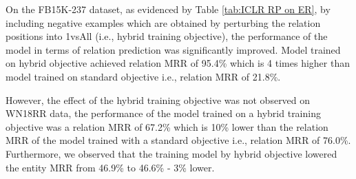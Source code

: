 \begin{table}[!htbp]
\centering
{}
\caption[Model performance in three objectives (selected on entity MRR)]{Model performance in standard, hybrid, and relation training objectives on FB15K-237 and WN18RR. The best models were selected on entity MRR. }
\label{tab:ICLR RP on ER}
\end{table}

On the FB15K-237 dataset, as evidenced by Table \ref{tab:ICLR RP on ER}, by including negative examples which are obtained by perturbing the relation positions into 1vsAll (i.e., hybrid training objective), the performance of the model in terms of relation prediction was significantly improved. Model trained on hybrid objective achieved relation MRR of 95.4\% which is 4 times higher than model trained on standard objective i.e., relation MRR of 21.8\%. 

However, the effect of the hybrid training objective was not observed on WN18RR data, the performance of the model trained on a hybrid training objective was a relation MRR of 67.2\% which is 10\% lower than the relation MRR of the model trained with a standard objective i.e., relation MRR of 76.0\%. Furthermore, we observed that the training model by hybrid objective lowered the entity MRR from 46.9\% to 46.6\% - 3\% lower.

